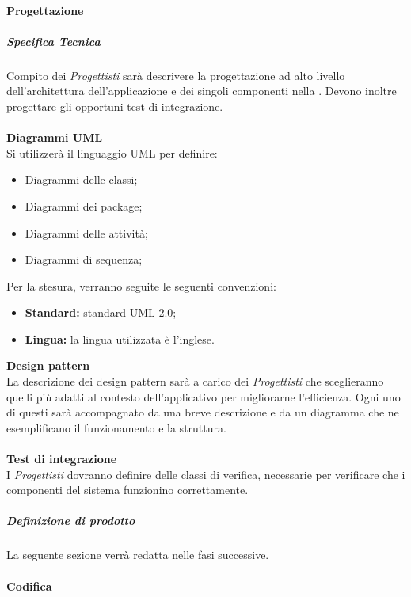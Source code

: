 			\paragraph{Progettazione}
				\subparagraph{Specifica Tecnica}
Compito dei \emph{Progettisti} sarà descrivere la progettazione ad alto livello dell'architettura dell'applicazione e dei singoli componenti nella \docNameVersionST. Devono inoltre progettare gli opportuni test di integrazione.\\ \\
					\noindent
					\textbf{Diagrammi UML}\\
Si utilizzerà il linguaggio UML per definire:
						\begin{itemize}
							\item Diagrammi delle classi;
							\item Diagrammi dei package;
							\item Diagrammi delle attività;
							\item Diagrammi di sequenza;
						\end{itemize}
Per la stesura, verranno seguite le seguenti convenzioni:
						\begin{itemize}
							\item \textbf{Standard:} standard UML 2.0;
							\item \textbf{Lingua:} la lingua utilizzata è l'inglese.
						\end{itemize}
					\textbf{Design pattern}\\
La descrizione dei design pattern sarà a carico dei \emph{Progettisti} che sceglieranno quelli più adatti al contesto dell'applicativo per migliorarne l'efficienza. Ogni uno di questi sarà accompagnato da una breve descrizione e da un diagramma che ne esemplificano il funzionamento e la struttura.\\ \\
					\textbf{Test di integrazione}\\
I \emph{Progettisti} dovranno definire delle classi di verifica, necessarie per verificare che i componenti del sistema funzionino correttamente.\\ 
				\subparagraph{Definizione di prodotto}
				
La seguente sezione verrà redatta nelle fasi successive.					

			\paragraph{Codifica}



